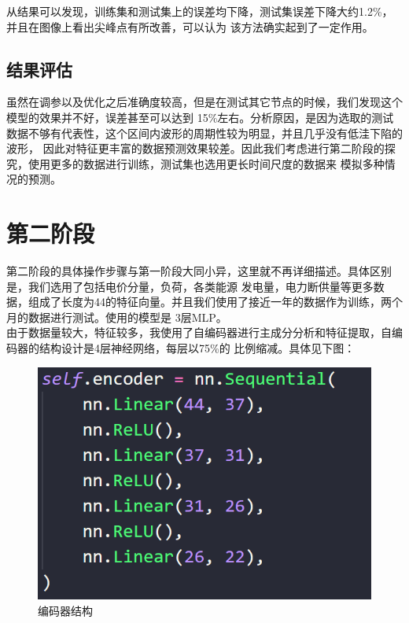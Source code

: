 \documentclass[UTF-8, 10pt]{ctexart}
\begin{document}
                \indent{}从结果可以发现，训练集和测试集上的误差均下降，测试集误差下降大约1.2\%，并且在图像上看出尖峰点有所改善，可以认为
                    该方法确实起到了一定作用。\\
                
            \subsection{结果评估}虽然在调参以及优化之后准确度较高，但是在测试其它节点的时候，我们发现这个模型的效果并不好，误差甚至可以达到
            15\%左右。分析原因，是因为选取的测试数据不够有代表性，这个区间内波形的周期性较为明显，并且几乎没有低洼下陷的波形，
            因此对特征更丰富的数据预测效果较差。因此我们考虑进行第二阶段的探究，使用更多的数据进行训练，测试集也选用更长时间尺度的数据来
            模拟多种情况的预测。\\

            \section{第二阶段}
                \indent{}第二阶段的具体操作步骤与第一阶段大同小异，这里就不再详细描述。具体区别是，我们选用了包括电价分量，负荷，各类能源
                发电量，电力断供量等更多数据，组成了长度为44的特征向量。并且我们使用了接近一年的数据作为训练，两个月的数据进行测试。使用的模型是
                3层MLP。\\
                \indent{}由于数据量较大，特征较多，我使用了自编码器进行主成分分析和特征提取，自编码器的结构设计是4层神经网络，每层以75\%的
                比例缩减。具体见下图：\\
                \begin{figure}[H]                                        %
                    \centering                                                      %
                    \includegraphics[width = .4\textwidth]{autoencoder.png}            %
                    \caption{编码器结构}\label{1}                               %
                    \end{figure}
\end{document}

